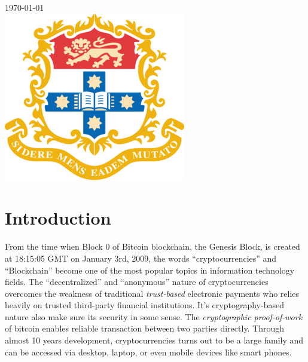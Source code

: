 \documentclass[12pt]{article}
\begin{document}
\begin{titlepage}
{\large \today}\\[2cm] %


\includegraphics{logo.png}\\[1cm] %
 

\vfill %

\end{titlepage}

\tableofcontents
\vfill

\newpage


\section{Introduction}

From the time when Block 0 of Bitcoin blockchain, the Genesis Block, is created at 18:15:05 GMT on January 3rd, 2009, the words ``cryptocurrencies'' and ``Blockchain'' become one of the most popular topics in information technology fields. The ``decentralized'' and ``anonymous'' nature of cryptocurrencies overcomes the weakness of traditional \textit{trust-based} electronic payments who relies heavily on trusted third-party financial institutions. It's cryptography-based nature also make sure its security in some sense. The \textit{cryptographic proof-of-work} of bitcoin enables reliable transaction between two parties directly\cite{nakamoto2008bitcoin}. Through almost 10 years development, cryptocurrencies turns out to be a large family and can be accessed via desktop, laptop, or even mobile devices like smart phones.
\end{document}
